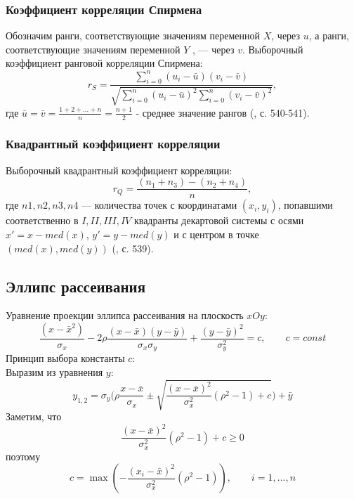 \documentclass[12pt,a4paper]{article}
\begin{document}
			\subsubsection{Коэффициент корреляции Спирмена}
				Обозначим ранги, соответствующие значениям переменной $X$, через $u$, а ранги, соответствующие значениям переменной $Y$ , — через $v$.
				Выборочный коэффициент ранговой корреляции Спирмена:
				\begin{equation}\label{spearmen}
					r_S = \frac{\sum_{i=0}^{n}(u_i-\bar{u})(v_i-\bar{v})}{\sqrt{\sum_{i=0}^{n}(u_i-\bar{u})^2\sum_{i=0}^{n}(v_i-\bar{v})^2}},
				\end{equation}
				где $\bar{u} = \bar{v} = \frac{1 + 2+...+n}{n} = \frac{n+1}{2}$ - среднее значение рангов (\cite{coeffs}, с. 540-541).
			\subsubsection{Квадрантный коэффициент корреляции}		
				Выборочный квадрантный коэффициент корреляции:
				\begin{equation}\label{quadrant}
					r_Q = \frac{(n_1 + n_3)-(n_2+n_4)}{n},
				\end{equation}
				где $n1, n2, n3, n4$ — количества точек с координатами $(x_i, y_i)$, попавшими
				соответственно в $I, II, III, IV$ квадранты декартовой системы с осями $x'=x-med(x)$, $y'=y-med(y)$ и с центром в точке $(med(x), med(y))$ (\cite{coeffs}, с. 539).
		\subsection{Эллипс рассеивания}
			Уравнение проекции эллипса рассеивания на плоскость $xOy$:
			\begin{equation}\label{ellipse}
				\frac{(x-\bar{x}^2)}{\sigma_x}-2\rho\frac{(x-\bar{x})(y-\bar{y})}{\sigma_x\sigma_y} + \frac{(y-\bar{y})^2}{\sigma_y^2} = c, \qquad c=const
			\end{equation}
			Принцип выбора константы $c$:\\
			Выразим из уравнения $y$:\\
			\begin{equation}
				y_{1, 2} = \sigma_y\Bigg(\rho\frac{x-\bar{x}}{\sigma_x}\pm\sqrt{\frac{(x-\bar{x})^2}{\sigma_x^2}(\rho^2-1)+c}\Bigg)+\bar{y}
			\end{equation}
			Заметим, что 
			\begin{equation}
				\frac{(x-\bar{x})^2}{\sigma_x^2}(\rho^2-1)+c \geq 0
			\end{equation}
			поэтому
			\begin{equation}
				c = \max({-\frac{(x_i-\bar{x})^2}{\sigma_x^2}(\rho^2-1)}), \qquad i = 1, ... , n
			\end{equation}
\end{document}
